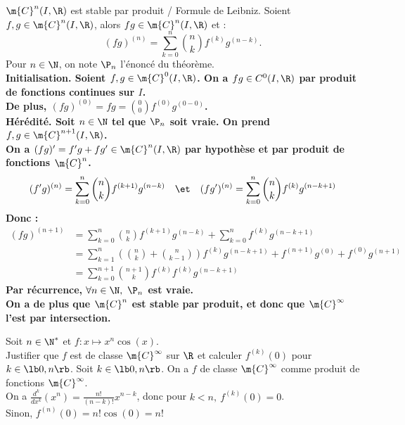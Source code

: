 \documentclass[11pt]{article}
\begin{document}
\begin{thm}{$\m{C}^n(I,\R)$ est stable par produit / Formule de Leibniz.}{}
    Soient $f,g\in\m{C}^n(I,\R)$, alors $fg\in\m{C}^n(I,\R)$ et :
    \begin{equation*}
        (fg)^{(n)}=\sum_{k=0}^n\binom{n}{k}f^{(k)}g^{(n-k)}.
    \end{equation*}
    \tcblower
    Pour $n\in\N$, on note $\P_n$ l'énoncé du théorème.\\
    \bf{Initialisation.} Soient $f,g\in\m{C}^0(I,\R)$. On a $fg\in C^0(I,\R)$ par produit de fonctions continues sur $I$.\\
    De plus, $(fg)^{(0)}=fg=\binom{0}{0}f^{(0)}g^{(0-0)}$.\\
    \bf{Hérédité.} Soit $n\in\N$ tel que $\P_n$ soit vraie. On prend $f,g\in\m{C}^{n+1}(I,\R)$.\\
    On a $(fg)'=f'g+fg'\in\m{C}^n(I,\R)$ par hypothèse et par produit de fonctions $\m{C}^n$.
    \begin{equation*}
        (f'g)^{(n)}=\sum_{k=0}^n\binom{n}{k}f^{(k+1)}g^{(n-k)}\quad\et\quad(fg')^{(n)}=\sum_{k=0}^n\binom{n}{k}f^{(k)}g^{(n-k+1)}
    \end{equation*}
    Donc :
    \begin{align*}
        (fg)^{(n+1)}&=\sum_{k=0}^n\binom{n}{k}f^{(k+1)}g^{(n-k)}+\sum_{k=0}^nf^{(k)}g^{(n-k+1)}\\
        &=\sum_{k=1}^n\left( \binom{n}{k}+\binom{n}{k-1} \right)f^{(k)}g^{(n-k+1)} + f^{(n+1)}g^{(0)} + f^{(0)}g^{(n+1)}\\
        &=\sum_{k=0}^{n+1}\binom{n+1}{k}f^{(k)}f^{(k)}g^{(n-k+1)}
    \end{align*}
    Par récurrence, $\forall n \in \N, ~ \P_n$ est vraie.\\
    On a de plus que $\m{C}^n$ est stable par produit, et donc que $\m{C}^{\infty}$ l'est par intersection.
\end{thm}

\vspace*{-0.4cm}

\begin{ex}{}{}
    Soit $n\in\N^*$ et $f:x\mapsto x^n\cos(x)$.\\
    Justifier que $f$ est de classe $\m{C}^\infty$ sur $\R$ et calculer $f^{(k)}(0)$ pour $k\in\lb0,n\rb$.
    \tcblower
    Soit $k\in\lb0,n\rb$. On a $f$ de classe $\m{C}^\infty$ comme produit de fonctions $\m{C}^\infty$.\\
    On a $\frac{d^k}{dx^k}(x^n)=\frac{n!}{(n-k)!}x^{n-k}$, donc pour $k<n, ~ f^{(k)}(0)=0$.\\
    Sinon, $f^{(n)}(0)=n!\cos(0)=n!$
\end{ex}
\end{document}
